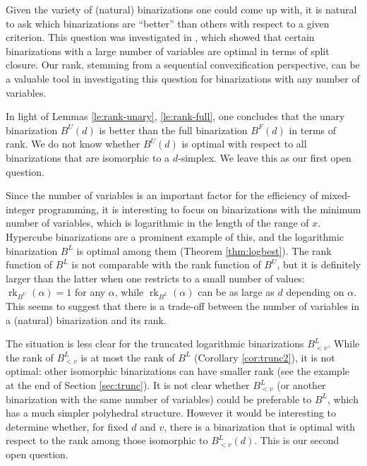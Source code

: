 \documentclass[11pt,a4paper]{article}
\newcommand{\1}{\textbf{1}}
\newcommand{\rk}{\operatorname{rk}}
\begin{document}
Given the variety of (natural) binarizations one could come up with, it is natural to ask which binarizations are ``better'' than others with respect to a given criterion. This question was investigated in \cite{dash2018binary}, which showed that certain binarizations with a large number of variables are optimal in terms of split closure. Our rank, stemming from a sequential convexification perspective, can be a valuable tool in investigating this question for binarizations with any number of variables. %

In light of Lemmas \ref{le:rank-unary}, \ref{le:rank-full}, one concludes that the unary binarization $B^U(d)$ is better than the full binarization $B^F(d)$ in terms of rank. We do not know whether $B^U(d)$ is optimal with respect to all binarizations that are isomorphic to a $d$-simplex. We leave this as our first open question.

Since the number of variables is an important factor for the efficiency of mixed-integer programming, it is interesting to focus on binarizations with the minimum number of variables, which is logarithmic in the length of the range of $x$.
Hypercube binarizations are a prominent example of this, and the logarithmic binarization $B^L$ is optimal among them (Theorem \ref{thm:logbest}). The rank function of $B^L$ is not comparable with the rank function of $B^U$, but it is definitely larger than the latter when one restricts to a small number of values: $\rk_{B^U}(\alpha)=1$ for any $\alpha$, while $\rk_{B^L}(\alpha)$ can be as large as $d$ depending on $\alpha$. This seems to suggest that there is a trade-off between the number of variables in a (natural) binarization and its rank. 

The situation is less clear for the truncated logarithmic binarizations $B^L_{<v}$. While the rank of $B^L_{<v}$ is at most the rank of $B^L$ (Corollary \ref{cor:trunc2}), it is not optimal: other isomorphic binarizations can have smaller rank (see the example at the end of Section \ref{sec:trunc}). It is not clear whether $B^L_{<v}$ (or another binarization with the same number of variables) could be preferable to $B^L$, which has a much simpler polyhedral structure. However it would be interesting to determine whether, for fixed $d$ and $v$, there is a binarization that is optimal with respect to the rank among those isomorphic to $B^L_{<v}(d)$. This is our second open question.
\end{document}
